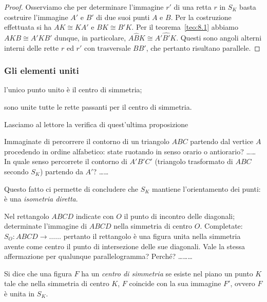 \begin{proof}
Osserviamo che per determinare l'immagine $r'$ di una retta $r$ in $S_K$ basta costruire l'immagine $A'$ e $B'$ di due suoi punti $A$ e $B$. Per la costruzione effettuata si ha $AK\cong KA'$ e $BK\cong B'K$. Per il teorema~\ref{teo:8.1} abbiamo $AKB\cong A'KB'$ dunque, in particolare, $A\widehat{B}K\cong A'\widehat{B'}K$. Questi sono angoli alterni interni delle rette $r$ ed $r'$ con trasversale $BB'$, che pertanto risultano parallele.
\end{proof}

\subsubsection{Gli elementi uniti}
\begin{itemize*}
\item l'unico punto unito è il centro di simmetria;
\item sono unite tutte le rette passanti per il centro di simmetria.
\end{itemize*}
Lasciamo al lettore la verifica di quest'ultima proposizione

Immaginate di percorrere il contorno di un triangolo $ABC$ partendo dal vertice $A$ procedendo in ordine alfabetico: state ruotando in senso orario o antiorario? \ldots\ldots{} In quale senso percorrete il contorno di $A'B'C'$ (triangolo trasformato di $ABC$ secondo $S_K$) partendo da $A'$? \ldots\ldots{}

Questo fatto ci permette di concludere che $S_K$ mantiene l'orientamento dei punti: è una \emph{isometria diretta}.

\begin{exrig}
\begin{esempio}
Nel rettangolo $ABCD$ indicate con $O$ il punto di incontro delle diagonali; determinate l'immagine di $ABCD$ nella simmetria di centro $O$. Completate: $S_O:ABCD \rightarrow \ldots\ldots{}$ pertanto il rettangolo è una figura unita nella simmetria avente come centro il punto di intersezione delle sue diagonali.
Vale la stessa affermazione per qualunque parallelogramma? Perché? \ldots\ldots\ldots{}
\end{esempio}
\end{exrig}

\begin{definizione}
Si dice che una figura $F$ ha un \emph{centro di simmetria} se esiste nel piano un punto $K$ tale che nella simmetria di centro $K$, $F$ coincide con la sua immagine $F'$, ovvero $F$ è unita in $S_K$. 
\end{definizione}

